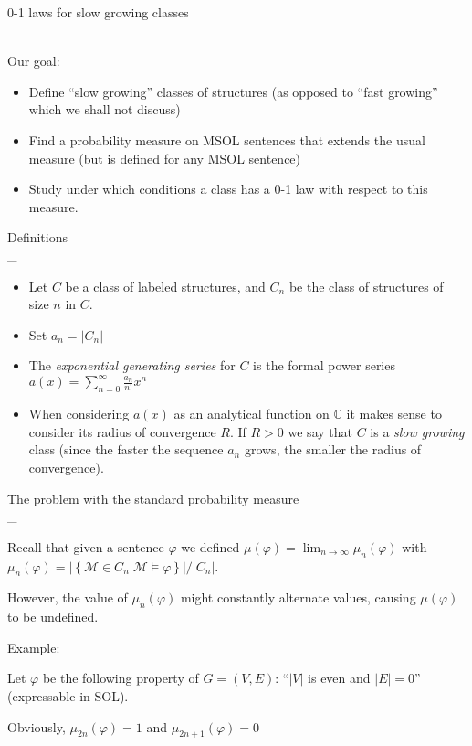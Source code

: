\documentclass[landscape,a4]{myslides}
\begin{document}
\begin{slide}
\begin{center}
{%
\color{blue}
0-1 laws for slow growing classes
}
\\
\_\hrulefill
\end{center}

Our goal:
{\small
\begin{itemize}
\item
Define ``slow growing'' classes of structures (as opposed to ``fast growing'' which we shall not discuss)
\item
Find a probability measure on MSOL sentences that extends the usual measure (but is defined for any MSOL sentence)
\item
Study under which conditions a class has a 0-1 law with respect to this measure.
\end{itemize}
}
\end{slide}
 
\begin{slide}
\begin{center}
{%
\color{blue}
Definitions
}
\\
\_\hrulefill

\end{center}
\small
\begin{itemize}
 \item Let $C$ be a class of labeled structures, and $C_n$ be the class of structures of size $n$ in $C$.
 \item Set $a_n = |C_n|$
 \item The \emph{exponential generating series} for $C$ is the formal power series $a(x)=\sum_{n=0}^\infty\frac{a_n}{n!}x^n$
 \item When considering $a(x)$ as an analytical function on $\mathbb{C}$ it makes sense to consider its radius of convergence $R$. If $R>0$ we say that $C$ is
a \emph{slow growing} class (since the faster the sequence $a_n$ grows, the smaller the radius of convergence).
\end{itemize}

\end{slide}

\begin{slide}
\begin{center}
{%
\color{blue}
The problem with the standard probability measure
}
\\
\_\hrulefill


\end{center}

\small
Recall that given a  sentence $\varphi$ we defined $\mu(\varphi)=\lim_{n\to\infty}\mu_n(\varphi)$ with $\mu_n(\varphi)=|\left\{\mathcal{M}\in C_n|\mathcal{M}\models\varphi \right\}| / |C_n|$.

However, the value of $\mu_n(\varphi)$ might constantly alternate values, causing $\mu(\varphi)$ to be undefined.

Example:

Let $\varphi$ be the following property of $G=(V,E)$: ``$|V|$ is even and $|E|=0$'' (expressable in SOL).

Obviously, $\mu_{2n}(\varphi) = 1$ and $\mu_{2n+1}(\varphi) = 0$
\end{slide}
\end{document}
